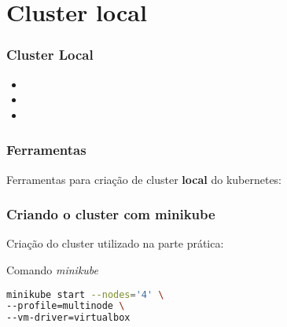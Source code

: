 \section{Cluster local}

\begin{frame}
\frametitle{Cluster Local}
\begin{itemize}
	\item {}
	\item {}
	\item {}
\end{itemize}
\end{frame}

\begin{frame}
\frametitle{Ferramentas}
Ferramentas para criação de cluster \textbf{local} do kubernetes:
\begin{itemize}
\end{itemize}
\end{frame}

\begin{frame}[containsverbatim]
\frametitle{Criando o cluster com minikube}
Criação do cluster utilizado na parte prática:
\begin{center}
\begin{minipage}{0.9\textwidth}
\begin{block}{Comando \textit{minikube}}
\begin{lstlisting}[language=bash]
minikube start --nodes='4' \
--profile=multinode \
--vm-driver=virtualbox
\end{lstlisting}
\end{block}
\end{minipage}
\end{center}
\end{frame}

